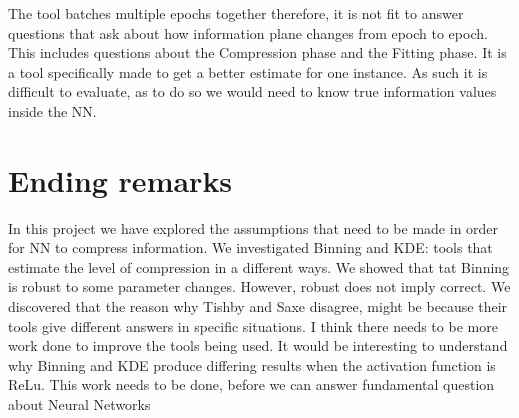 \documentclass[dissertation.tex]{subfiles}
\begin{document}
The tool batches multiple epochs together therefore, it is not fit to answer
questions that ask about how information plane changes from epoch to epoch.
This includes questions about the Compression phase and the Fitting phase.  It
is a tool specifically made to get a better estimate for one instance. As such it
is difficult to evaluate, as to do so we would need to know true information
values inside the NN.

\section{Ending remarks}

In this project we have explored the assumptions that need to be made in order
for NN to compress information.  We investigated Binning and KDE: tools that
estimate the level of compression in a different ways.  We showed that tat
Binning is robust to some parameter changes.  However, robust does not imply
correct.  We discovered that the reason why Tishby and Saxe disagree, might be
because their tools give different answers in specific situations.  I think
there needs to be more work done to improve the tools being used.  It would be
interesting to understand why Binning and KDE produce differing results when the
activation function is ReLu. This work needs to be done, before we can answer
fundamental question about Neural Networks 
\end{document}

